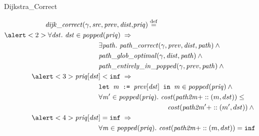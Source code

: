 \documentclass[usenames, xcolor=dvipsnames]{beamer}
\newcommand{\ifty}{\texttt{inf}}
\newcommand{\defeq}{\mathbin{\overset{\mathrm{def}}{=}}}
\newcommand{\m}[1]{\ensuremath{\mathit{#1}}} %
\begin{document}
\begin{frame}{Dijkstra\_Correct}

\begin{equation*}
\begin{split}
\m{dijk\_correct}(\gamma, \m{src}, \m{prev}, \m{dist},& \m{priq}) \; \defeq \; \\
\alert<2>{\forall \m{dst}.~\m{dst} \in \m{popped}(\m{priq}) \; \Rightarrow} \; & \\ 
& \hspace{-5em} \exists \m{path}.~\m{path\_correct}(\gamma, \m{prev}, \m{dist}, \m{path}) \wedge \null \\
& \hspace{-5em} \m{path\_glob\_optimal}(\gamma, \m{dist}, \m{path}) \wedge \null \\
& \hspace{-5em} \m{path\_entirely\_in\_popped}(\gamma, \m{prev}, \m{path}) \wedge \null \\
\alert<3>{\m{priq}[\m{dst}] < \ifty \; \Rightarrow} \; & \\ 
& \hspace{-5em} \texttt{let }\m{m} \texttt{ := } \m{prev}[\m{dst}] \texttt{ in } \m{m} \in \m{popped}(\m{priq}) \wedge \null \\
& \hspace{-5em} \forall \m{m'} \in \m{popped}(\m{priq}).~\m{cost}(\m{path2m} +:: (m, dst)) \le \null \\
& \hspace{-5em} \hspace{10em} \m{cost}(\m{path2m'} +:: (m', dst)) \wedge \null \\
\alert<4>{\m{priq}[\m{dst}] = \ifty \; \Rightarrow} \; & \\ 
& \hspace{-5em} \forall \m{m} \in \m{popped}(\m{priq}).~\m{cost}(\m{path2m} +:: (m, dst)) = \ifty
\end{split}
\end{equation*}

\end{frame}
\end{document}

